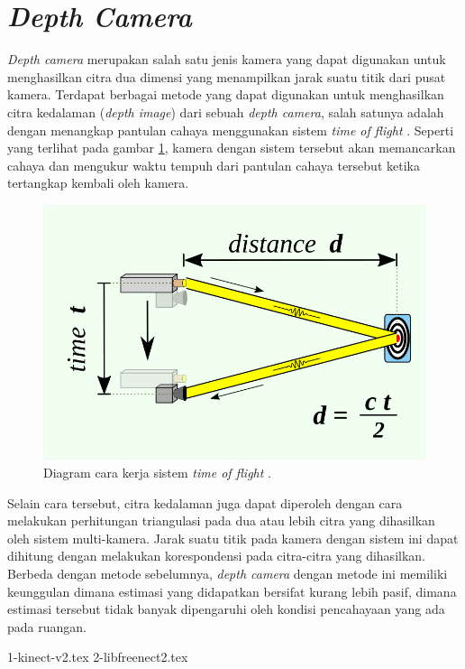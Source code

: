 \section{\emph{Depth Camera}}
\label{sec:depthcamera}

\emph{Depth camera} merupakan salah satu jenis kamera yang dapat digunakan untuk menghasilkan citra dua dimensi yang menampilkan jarak suatu titik dari pusat kamera.
Terdapat berbagai metode yang dapat digunakan untuk menghasilkan citra kedalaman (\emph{depth image}) dari sebuah \emph{depth camera},
  salah satunya adalah dengan menangkap pantulan cahaya menggunakan sistem \emph{time of flight} \citep{cit:idan2001}.
Seperti yang terlihat pada gambar \ref{fig:diagramtimeofflight},
  kamera dengan sistem tersebut akan memancarkan cahaya dan mengukur waktu tempuh dari pantulan cahaya tersebut ketika tertangkap kembali oleh kamera.

\begin{figure}[ht]
  \centering
  \includegraphics[scale=0.25]{gambar/diagram-time-of-flight.png}
  \caption{Diagram cara kerja sistem \emph{time of flight} \citep{url:timeofflight}.}
  \label{fig:diagramtimeofflight}
\end{figure}

Selain cara tersebut,
  citra kedalaman juga dapat diperoleh dengan cara melakukan perhitungan triangulasi pada dua atau lebih citra yang dihasilkan oleh sistem multi-kamera.
Jarak suatu titik pada kamera dengan sistem ini dapat dihitung dengan melakukan korespondensi pada citra-citra yang dihasilkan.
Berbeda dengan metode sebelumnya,
  \emph{depth camera} dengan metode ini memiliki keunggulan dimana estimasi yang didapatkan bersifat kurang lebih pasif,
  dimana estimasi tersebut tidak banyak dipengaruhi oleh kondisi pencahayaan yang ada pada ruangan.

{1-kinect-v2.tex}
{2-libfreenect2.tex}
